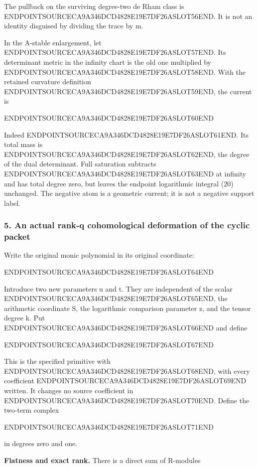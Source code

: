 The pullback on the surviving degree-two de Rham class is ENDPOINTSOURCECA9A346DCD4828E19E7DF26ASLOT56END. It is not an identity disguised by dividing the trace by m.

In the A-stable enlargement, let ENDPOINTSOURCECA9A346DCD4828E19E7DF26ASLOT57END. Its determinant metric in the infinity chart is the old one multiplied by ENDPOINTSOURCECA9A346DCD4828E19E7DF26ASLOT58END. With the retained curvature definition ENDPOINTSOURCECA9A346DCD4828E19E7DF26ASLOT59END, the current is

ENDPOINTSOURCECA9A346DCD4828E19E7DF26ASLOT60END

Indeed ENDPOINTSOURCECA9A346DCD4828E19E7DF26ASLOT61END. Its total mass is ENDPOINTSOURCECA9A346DCD4828E19E7DF26ASLOT62END, the degree of the dual determinant. Full saturation subtracts ENDPOINTSOURCECA9A346DCD4828E19E7DF26ASLOT63END at infinity and has total degree zero, but leaves the endpoint logarithmic integral (20) unchanged. The negative atom is a geometric current; it is not a negative support label.

\subsubsection{5. An actual rank-q cohomological deformation of the cyclic packet}\label{endpoint-exponential_original--an-actual-rank-q-cohomological-deformation-of-the-cyclic-packet}

Write the original monic polynomial in its original coordinate:

ENDPOINTSOURCECA9A346DCD4828E19E7DF26ASLOT64END

Introduce two new parameters u and t. They are independent of the scalar ENDPOINTSOURCECA9A346DCD4828E19E7DF26ASLOT65END, the arithmetic coordinate S, the logarithmic comparison parameter z, and the tensor degree k. Put ENDPOINTSOURCECA9A346DCD4828E19E7DF26ASLOT66END and define

ENDPOINTSOURCECA9A346DCD4828E19E7DF26ASLOT67END

This is the specified primitive with ENDPOINTSOURCECA9A346DCD4828E19E7DF26ASLOT68END, with every coefficient ENDPOINTSOURCECA9A346DCD4828E19E7DF26ASLOT69END written. It changes no source coefficient in ENDPOINTSOURCECA9A346DCD4828E19E7DF26ASLOT70END. Define the two-term complex

ENDPOINTSOURCECA9A346DCD4828E19E7DF26ASLOT71END

in degrees zero and one.

\textbf{Flatness and exact rank.} There is a direct sum of R-modules

